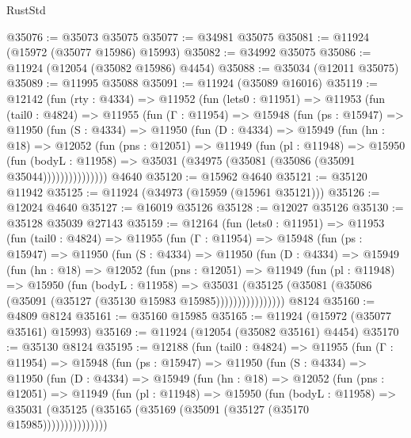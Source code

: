 \begin{lexlean}{RustStd}
\begin{coremodule}
{\begin{coremodule}
{{{{{{{{{{{{{{{{{{{{{{{{{{{{{{{{{{{{{{{{{{{{{{{{{{{{{{{{{{{{{{{{{{{{{{{{{{{{{{{{@35076 := @35073 @35075
@35077 := @34981 @35075
@35081 := @11924 (@15972 (@35077 @15986) @15993)
@35082 := @34992 @35075
@35086 := @11924 (@12054 (@35082 @15986) @4454)
@35088 := @35034 (@12011 @35075)
@35089 := @11995 @35088
@35091 := @11924 (@35089 @16016)
@35119 := @12142
    (fun (rty : @4334) =>
    @11952
      (fun (lets0 : @11951) =>
      @11953
        (fun (tail0 : @4824) =>
        @11955
          (fun (Γ : @11954) =>
          @15948
            (fun (ps : @15947) =>
            @11950
              (fun (S : @4334) =>
              @11950
                (fun (D : @4334) =>
                @15949
                  (fun (hn : @18) =>
                  @12052
                    (fun (pns : @12051) =>
                    @11949
                      (fun (pl : @11948) =>
                      @15950
                        (fun (bodyL : @11958) =>
                        @35031 (@34975 (@35081 (@35086 (@35091 @35044)))))))))))))))
    @4640
@35120 := @15962 @4640
@35121 := @35120 @11942
@35125 := @11924 (@34973 (@15959 (@15961 @35121)))
@35126 := @12024 @4640
@35127 := @16019 @35126
@35128 := @12027 @35126
@35130 := @35128 @35039 @27143
@35159 := @12164
    (fun (lets0 : @11951) =>
    @11953
      (fun (tail0 : @4824) =>
      @11955
        (fun (Γ : @11954) =>
        @15948
          (fun (ps : @15947) =>
          @11950
            (fun (S : @4334) =>
            @11950
              (fun (D : @4334) =>
              @15949
                (fun (hn : @18) =>
                @12052
                  (fun (pns : @12051) =>
                  @11949
                    (fun (pl : @11948) =>
                    @15950
                      (fun (bodyL : @11958) =>
                      @35031
                        (@35125
                          (@35081 (@35086 (@35091 (@35127 (@35130 @15983 @15985))))))))))))))))
    @8124
@35160 := @4809 @8124
@35161 := @35160 @15985
@35165 := @11924 (@15972 (@35077 @35161) @15993)
@35169 := @11924 (@12054 (@35082 @35161) @4454)
@35170 := @35130 @8124
@35195 := @12188
    (fun (tail0 : @4824) =>
    @11955
      (fun (Γ : @11954) =>
      @15948
        (fun (ps : @15947) =>
        @11950
          (fun (S : @4334) =>
          @11950
            (fun (D : @4334) =>
            @15949
              (fun (hn : @18) =>
              @12052
                (fun (pns : @12051) =>
                @11949
                  (fun (pl : @11948) =>
                  @15950
                    (fun (bodyL : @11958) =>
                    @35031 (@35125 (@35165 (@35169 (@35091 (@35127 (@35170 @15985)))))))))))))))
}}}}}}}}}}}}}}}}}}}}}}}}}}}}}}}}}}}}}}}}}}}}}}}}}}}}}}}}}}}}}}}}}}}}}}}}}}}}}}}}
\end{coremodule}}
\end{coremodule}
\end{lexlean}
